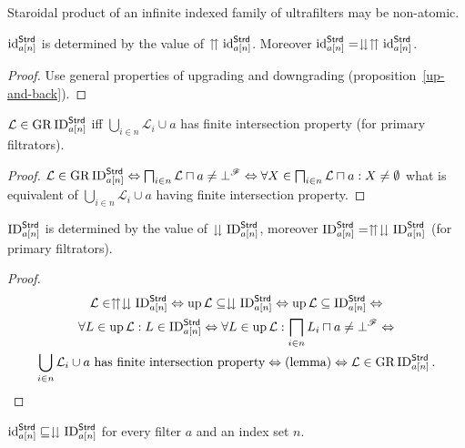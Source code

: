 \begin{cor}
Staroidal product of an infinite indexed family of ultrafilters may
be non-atomic.\end{cor}
\begin{prop}
$\operatorname{id}_{a[n]}^{\mathsf{Strd}}$ is determined by the value of $\upuparrows\operatorname{id}_{a[n]}^{\mathsf{Strd}}$.
Moreover $\operatorname{id}_{a[n]}^{\mathsf{Strd}}=\downdownarrows\upuparrows\operatorname{id}_{a[n]}^{\mathsf{Strd}}$.\end{prop}
\begin{proof}
Use general properties of upgrading and downgrading (proposition~\ref{up-and-back}).\end{proof}
\begin{lem}
$\mathcal{L}\in\operatorname{GR}\operatorname{ID}_{a[n]}^{\mathsf{Strd}}$ iff $\bigcup_{i\in n}\mathcal{L}_{i}\cup a$
has finite intersection property (for primary filtrators).\end{lem}
\begin{proof}
$\mathcal{L}\in\operatorname{GR}\operatorname{ID}_{a[n]}^{\mathsf{Strd}}\Leftrightarrow\bigsqcap_{i\in n}\mathcal{L}\sqcap a\neq\bot^{\mathscr{F}}\Leftrightarrow\forall X\in\bigsqcap_{i\in n}\mathcal{L}\sqcap a:X\neq\emptyset$
what is equivalent of $\bigcup_{i\in n}\mathcal{L}_{i}\cup a$ having
finite intersection property.\end{proof}
\begin{prop}
$\operatorname{ID}_{a[n]}^{\mathsf{Strd}}$ is determined by the value of $\downdownarrows\operatorname{ID}_{a[n]}^{\mathsf{Strd}}$,
moreover $\operatorname{ID}_{a[n]}^{\mathsf{Strd}}=\upuparrows\downdownarrows\operatorname{ID}_{a[n]}^{\mathsf{Strd}}$
(for primary filtrators).\end{prop}
\begin{proof}
~
\begin{multline*}
\mathcal{L}\in\upuparrows\downdownarrows\operatorname{ID}_{a[n]}^{\mathsf{Strd}}\Leftrightarrow\operatorname{up}\mathcal{L}\subseteq\downdownarrows\operatorname{ID}_{a[n]}^{\mathsf{Strd}}\Leftrightarrow\operatorname{up}\mathcal{L}\subseteq\operatorname{ID}_{a[n]}^{\mathsf{Strd}}\Leftrightarrow\\
\forall L\in\operatorname{up}\mathcal{L}:L\in\operatorname{ID}_{a[n]}^{\mathsf{Strd}}\Leftrightarrow\forall L\in\operatorname{up}\mathcal{L}:\bigsqcap_{i\in n}L_{i}\sqcap a\neq\bot^{\mathscr{F}}\Leftrightarrow\\
\bigcup_{i\in n}\mathcal{L}_{i}\cup a\text{ has finite intersection property}\Leftrightarrow\text{(lemma)}\Leftrightarrow\mathcal{L}\in\operatorname{GR}\operatorname{ID}_{a[n]}^{\mathsf{Strd}}.
\end{multline*}
\end{proof}
\begin{prop}
$\operatorname{id}_{a[n]}^{\mathsf{Strd}}\sqsubseteq\downdownarrows\operatorname{ID}_{a[n]}^{\mathsf{Strd}}$
for every filter $a$ and an index set $n$.\end{prop}
